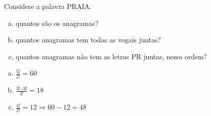 \begin{ex}
Considere a palavra PRAIA.
   \begin{enumerate}[(a)]
   \item quantos são os anagramas?
   \item quantos anagramas tem todas as vogais juntas?
   \item quantos anagramas não tem as letras PR juntas, nessa ordem?
   \end{enumerate}
    \begin{sol}
     \phantom{A} 
      \begin{enumerate} [(a)]
          \item $\frac{5!}{2!}=60$
          \item $\frac{3!\cdot3!}{2!}=18$
          \item $\frac{4!}{2!}=12 \Longrightarrow 60-12=48$
      \end{enumerate}
    \end{sol}
\end{ex}